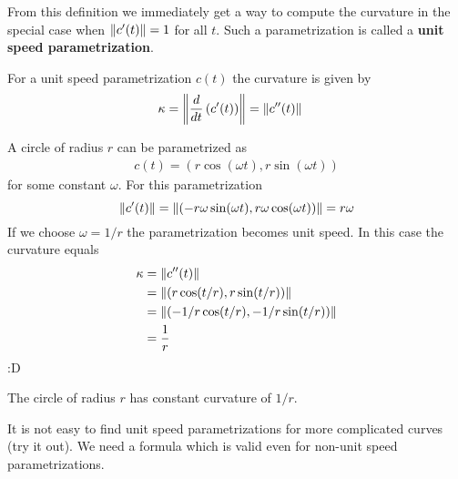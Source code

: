 From this definition we immediately get a way to compute the curvature in the special case when $ \lVert c'(t) \rVert=1$ for all $ t$. Such a parametrization is called a \textbf{unit speed parametrization}.
\begin{prop}
For a unit speed parametrization $c(t)$ the curvature is given by
\begin{align*}
	\kappa
	&= \left \lVert \dfrac{d}{dt} \left({c'(t)}\right) \right \rVert = \lVert c''(t) \rVert
\end{align*}
\end{prop}
\begin{example}
	A circle of radius $ r$ can be parametrized as
	\begin{align*}
		c(t) = (r \cos (\omega t), r \sin(\omega t))
	\end{align*}
	for some constant $ \omega$. For this parametrization
	$$\lVert c'(t) \rVert = \lVert  (-r \omega \sin (\omega t), r \omega \cos(\omega t)) \rVert = r \omega $$
	If we choose $ \omega = 1/r$ the parametrization becomes unit speed. In this case the curvature equals
	\begin{align*}
		\kappa
		 & = \lVert c''(t) \rVert                            \\
		 & = \lVert (r \cos (t/r), r \sin(t/r)) \rVert       \\
		 & = \lVert (-1/r \cos (t/r), -1/r \sin(t/r)) \rVert \\
		 & = \dfrac{1}{r}
	\end{align*}
:D
\end{example}

\begin{thm}
	The circle of radius $ r$ has constant curvature of $ 1/r$.
\end{thm}
It is not easy to find unit speed parametrizations for more complicated curves (try it out). We need a formula which is valid even for non-unit speed parametrizations.

